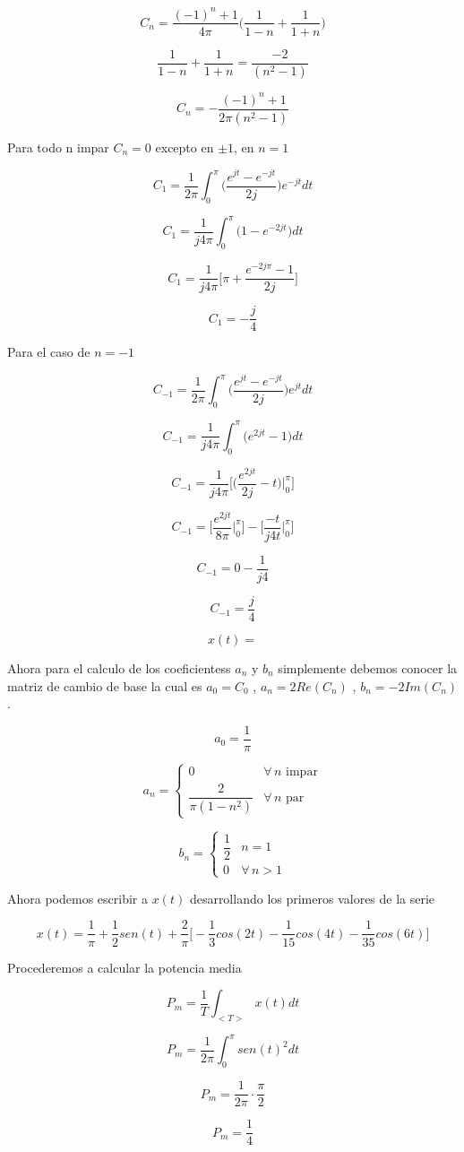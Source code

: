 $$C_n = \dfrac{(-1)^n + 1}{4\pi} \bigg(\dfrac{1}{1-n} + \dfrac{1}{1+n} \bigg) $$

$$\dfrac{1}{1-n} + \dfrac{1}{1+n} = \dfrac{-2}{(n^2-1)} $$

$$C_n = -\dfrac{(-1)^n + 1}{2\pi(n^2-1)} $$

Para todo n impar $C_n = 0$ excepto en $\pm 1$, en $n=1$

$$C_1 = \dfrac{1}{2\pi} \int_{0}^{\pi} \bigg(\dfrac{e^{jt} - e^{-jt}}{2j} \bigg) e^{-jt} dt $$

$$C_1 = \dfrac{1}{j4\pi} \int_{0}^{\pi} \bigg(1- e^{-2jt} \bigg) dt $$

$$C_1 = \dfrac{1}{j4\pi} \bigg[\pi + \dfrac{e^{-2j\pi} - 1}{2j} \bigg] $$

$$C_1 = -\dfrac{j}{4} $$

Para el caso de $n=-1$

$$C_{-1} = \dfrac{1}{2\pi} \int_{0}^{\pi} \bigg(\dfrac{e^{jt} - e^{-jt}}{2j} \bigg) e^{jt} dt $$

$$C_{-1} = \dfrac{1}{j4\pi} \int_{0}^{\pi} \bigg(e^{2jt} - 1 \bigg) dt$$

$$C_{-1} = \dfrac{1}{j4\pi} \bigg[\bigg(\dfrac{e^{2jt}}{2j} - t \bigg)\bigg\rvert_{0}^{\pi} \bigg]$$

$$C_{-1} = \bigg[\dfrac{e^{2jt}}{8\pi}\bigg\rvert_{0}^{\pi} \bigg] - \bigg[\dfrac{-t}{j4t}\bigg\rvert_{0}^{\pi} \bigg] $$

$$C_{-1} = 0 - \dfrac{1}{j4} $$

$$C_{-1} = \dfrac{j}{4} $$

$$x(t) = $$

Ahora para el calculo de los coeficientess $a_n$ y $b_n$ simplemente debemos conocer la matriz de
cambio de base la cual es $a_0 = C_0$ , $a_n = 2Re(C_n)$ , $b_n = -2Im(C_n)$.

\[
a_0 = \frac{1}{\pi}
\]

\[
a_n =
\begin{cases}
0 & \forall \, n \text{ impar} \\
\dfrac{2}{\pi(1-n^2)} & \forall \, n \text{ par}
\end{cases}
\]

\[
b_n =
\begin{cases}
\dfrac{1}{2} & n = 1 \\
0 & \forall \, n > 1
\end{cases}
\]

Ahora podemos escribir a $x(t)$ desarrollando los primeros valores de la serie

$$x(t) = \dfrac{1}{\pi} + \dfrac{1}{2}sen(t) + \dfrac{2}{\pi} \bigg[-\dfrac{1}{3} cos(2t) - \dfrac{1}{15} cos(4t) - \dfrac{1}{35} cos(6t)\bigg] $$

Procederemos a calcular la potencia media

$$P_m = \dfrac{1}{T} \int_{<T>} x(t) dt $$

$$P_m = \dfrac{1}{2\pi} \int_{0}^{\pi} sen(t)^2 dt $$

$$P_m = \dfrac{1}{2\pi} \cdot \dfrac{\pi}{2} $$

$$P_m = \dfrac{1}{4}$$
